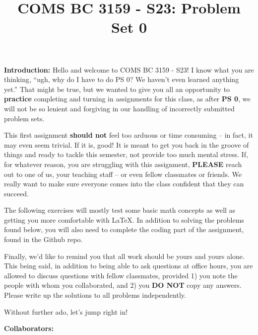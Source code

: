 \documentclass[]{article}
\title{COMS BC 3159 - S23: Problem Set 0}
\author{
}
\date{}
\begin{document}
\maketitle

\textbf{Introduction:}  
Hello and welcome to COMS BC 3159 - S23!  I know what you are thinking, ``ugh, why do I have to do PS 0?  We haven't even learned anything yet.''  That might be true, but we wanted to give you all an opportunity to \textbf{practice} completing and turning in assignments for this class, as after \textbf{PS 0}, we will not be so lenient and forgiving in our handling of incorrectly submitted problem sets.

This first assignment \textbf{should not} feel too arduous or time consuming -- in fact, it may even seem trivial.  If it is, good!  It is meant to get you back in the groove of things and ready to tackle this semester, not provide too much mental stress.  If, for whatever reason, you are struggling with this assignment, \textbf{PLEASE} reach out to one of us, your teaching staff -- or even fellow classmates or friends.  We really want to make sure everyone comes into the class confident that they can succeed.

The following exercises will mostly test some basic math concepts as well as getting you more comfortable with \LaTeX. In addition to solving the problems found below, you will also need to complete the coding part of the assignment, found in the Github repo. 

Finally, we'd like to remind you that all work should be yours and yours alone. This being said, in addition to being able to ask questions at office hours, you are allowed to discuss questions with fellow classmates, provided 1) you note the people with whom you collaborated, and 2) you \textbf{DO NOT} copy any answers. Please write up the solutions to all problems independently.

Without further ado, let's jump right in!

\bigskip
\textbf{Collaborators:}
\clearpage

\end{document}
